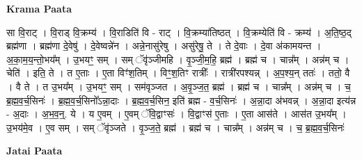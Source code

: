 \documentclass[17pt]{extarticle}
\begin{document}
\textbf{Krama Paata} \newline

सा वि॒राट् । वि॒राड् वि॒क्रम्य॑ । वि॒राडिति॑ वि - राट् । वि॒क्रम्या॑तिष्ठत् । वि॒क्रम्येति॑ वि - क्रम्य॑ । अ॒ति॒ष्ठ॒द् ब्रह्म॑णा । ब्रह्म॑णा दे॒वेषु॑ । दे॒वेष्वन्ने॑न । अन्ने॒नासु॑रेषु । असु॑रेषु॒ ते । ते दे॒वाः । दे॒वा अ॑कामयन्त । अ॒का॒म॒य॒न्तो॒भय᳚म् । उ॒भयꣳ॒॒ सम् । सम् ॅवृ॑ञ्जीमहि । वृ॒ञ्जी॒म॒हि॒ ब्रह्म॑ । ब्रह्म॑ च । चान्न᳚म् । अन्न॑म् च । चेति॑ । इति॒ ते । त ए॒ताः । ए॒ता विꣳ॑श॒तिम् । विꣳ॒॒श॒तिꣳ रात्रीः᳚ । रात्री॑रपश्यन्न् । अ॒प॒श्य॒न् ततः॑ । ततो॒ वै । वै ते । त उ॒भय᳚म् । उ॒भयꣳ॒॒ सम् । सम॑वृञ्जत । अ॒वृ॒ञ्ज॒त॒ ब्रह्म॑ । ब्रह्म॑ च । चान्न᳚म् । अन्न॑म् च । च॒ ब्र॒ह्म॒व॒र्च॒सिनः॑ । ब्र॒ह्म॒व॒र्च॒सिनो᳚ऽन्ना॒दाः । ब्र॒ह्म॒व॒र्च॒सिन॒ इति॑ ब्रह्म - व॒र्च॒सिनः॑ । अ॒न्ना॒दा अ॑भवन्न् । अ॒न्ना॒दा इत्य॑न्न - अ॒दाः । अ॒भ॒व॒न्॒. ये । य ए॒वम् । ए॒वम् ॅवि॒द्वाꣳसः॑ । वि॒द्वाꣳस॑ ए॒ताः । ए॒ता आस॑ते । आस॑त उ॒भय᳚म् । उ॒भय॑मे॒व । ए॒व सम् । सम् ॅवृ॑ञ्जते । वृ॒ञ्ज॒ते॒ ब्रह्म॑ । ब्रह्म॑ च । चान्न᳚म् । अन्न॑म् च । च॒ ब्र॒ह्म॒व॒र्च॒सिनः॑ \newline

\textbf{Jatai Paata} \newline
\end{document}

